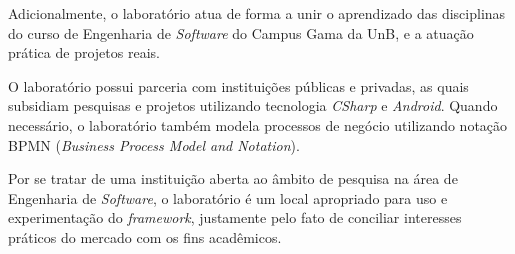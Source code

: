 Adicionalmente, o laboratório atua de forma a unir o aprendizado das disciplinas do curso de Engenharia de \textit{Software} do Campus Gama da UnB, e a atuação prática de projetos reais.

O laboratório possui parceria com instituições públicas e privadas, as quais subsidiam pesquisas e projetos utilizando tecnologia \textit{CSharp} e \textit{Android}. Quando necessário, o laboratório também modela processos de negócio utilizando notação BPMN (\textit{Business Process Model and Notation}).

Por se tratar de uma instituição aberta ao âmbito de pesquisa na área de Engenharia de \textit{Software}, o laboratório é um local apropriado para uso e experimentação do \textit{framework}, justamente pelo fato de conciliar interesses práticos do mercado com os fins acadêmicos.